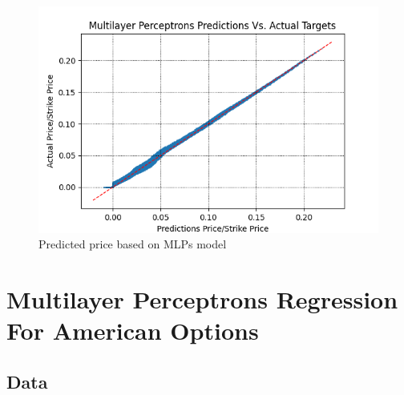 \begin{figure}[H]
\centering
\includegraphics{Figures/PredictionOutMoneyEuroC.png}
\decoRule
\caption[MLPs Predictions Vs. Actual Prices]{Predicted price based on MLPs model}
\label{fig:MLPsOutMoneyEuroC}
\end{figure}





\section{Multilayer Perceptrons Regression For American Options}

\subsection{Data}



